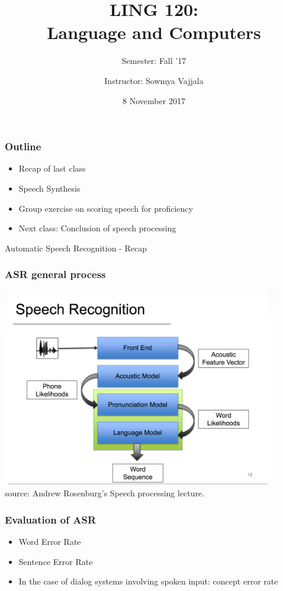 \documentclass{beamer}
\author[Sowmya Vajjala]{Instructor: Sowmya Vajjala}
\title[LING 120]{LING 120: \\ Language and Computers}
\subtitle{Semester: Fall '17}
\date{8 November 2017}
\institute{Iowa State University, USA}
\begin{document}
\begin{frame}\titlepage
\end{frame}

\begin{frame}
\frametitle{Outline}
\begin{itemize}
\item Recap of last class
\item Speech Synthesis
\item Group exercise on scoring speech for proficiency
\item Next class: Conclusion of speech processing
\end{itemize}
\end{frame}

\begin{frame}
\begin{center}
\Large Automatic Speech Recognition - Recap
\end{center}
\end{frame}

\begin{frame}
\frametitle{ASR general process}
\includegraphics[width=0.9\textwidth]{asr.png}
\\ \tiny source: Andrew Rosenburg's Speech processing lecture.
\end{frame}

\begin{frame}
\frametitle{Evaluation of ASR}
\begin{itemize}
\item Word Error Rate
\item Sentence Error Rate
\item In the case of dialog systems involving spoken input: concept error rate
\end{itemize}
\end{frame}
\end{document}
